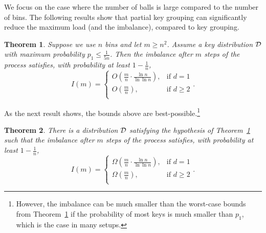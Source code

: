 \documentclass[10pt,conference,letterpaper]{IEEEtran}
\newcommand{\mycomment}[1]{}
\newtheorem{theorem}{Theorem}[section]
\begin{document}
We focus on the case where the number of balls is large compared to the number of bins. 
The following results show that partial key grouping can significantly reduce the maximum load (and the imbalance), compared to key
grouping.
\begin{theorem}\label{thm:main}
Suppose we use $n$ bins and let $m \ge n^2$.
Assume a key distribution $\calD$ with maximum probability $p_1 \le \frac{1}{5 n}$.
Then
the imbalance after $m$ steps of the  process satisfies, with probability at least $1-\frac{1}{n}$,
$$ I(m) = 
\begin{cases}
O\left(\frac{m}{n} \cdot \frac{\ln n}{\ln \ln n}\right), & \text{if } d = 1\\
O\left(\frac{m}{n}\right), & \text{if } d \geq 2\\
    \end{cases}
    . $$
\mycomment{
the following hold:
\begin{itemize}
\item For any $d\ge 2$, the imbalance after $m$ steps of the \code{Greedy-$d$} process satisfies, with probability at least $1-\frac{1}{n}$,
$$ I(m) = \Theta\left(\frac{m}{n}\right) . $$
Moreover, with probability at least $1-\frac{1}{n}$ over the choice of the $d$ hash functions, any load balancing policy using the same set of
choices for each key must have imbalance
$\Omega\left(\frac{m}{n}\right)$.
\item For some distributions $\calD$,
the imbalance after $m$ steps of the \code{Greedy-1} process satisfies, with probability at least $1-\frac{1}{n}$,
$$ I(m) = \Theta\left(\frac{m}{n} \cdot \frac{\ln n}{\ln \ln n}\right) . $$
\end{itemize}
}
\end{theorem}

As the next result shows, the bounds above are best-possible.\footnote{\scriptsize However, the imbalance can be much smaller than the worst-case bounds from Theorem~\ref{thm:main} if the probability of most keys is much smaller than $p_1$, which is the case in many setups. }
\begin{theorem}\label{thm:lb}
There is a distribution $\calD$ satisfying the hypothesis of Theorem~\ref{thm:main} such that
the imbalance after $m$ steps of the  process satisfies, with probability at least $1-\frac{1}{n}$,
$$ I(m) = 
\begin{cases}
\Omega\left(\frac{m}{n} \cdot \frac{\ln n}{\ln \ln n}\right), & \text{if } d = 1\\
\Omega\left(\frac{m}{n}\right), & \text{if } d \geq 2\\
    \end{cases}
    . $$
\end{theorem}
\end{document}
